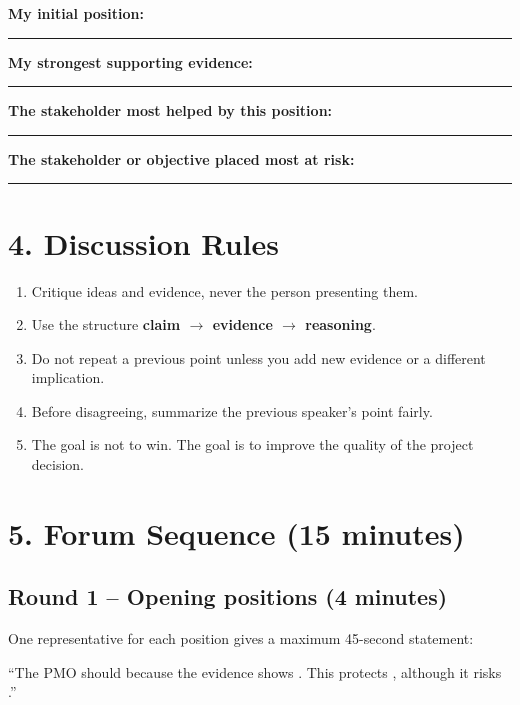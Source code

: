 \documentclass[11pt,a4paper]{article}
\newcommand{\blankline}{\rule{\linewidth}{0.35pt}}
\begin{document}
\textbf{My initial position:} \blankline

\textbf{My strongest supporting evidence:}

\vspace{8mm}\blankline

\textbf{The stakeholder most helped by this position:} \blankline

\textbf{The stakeholder or objective placed most at risk:} \blankline

\section{4. Discussion Rules}

\begin{rulebox}
\begin{enumerate}
  \item Critique ideas and evidence, never the person presenting them.
  \item Use the structure \textbf{claim $\rightarrow$ evidence $\rightarrow$ reasoning}.
  \item Do not repeat a previous point unless you add new evidence or a different implication.
  \item Before disagreeing, summarize the previous speaker's point fairly.
  \item The goal is not to win. The goal is to improve the quality of the project decision.
\end{enumerate}
\end{rulebox}

\section{5. Forum Sequence (15 minutes)}

\subsection*{Round 1 -- Opening positions (4 minutes)}

One representative for each position gives a maximum 45-second statement:

\begin{forumbox}
``The PMO should \underline{\hspace{4cm}} because the evidence shows \underline{\hspace{4cm}}. This protects \underline{\hspace{3cm}}, although it risks \underline{\hspace{3cm}}.''
\end{forumbox}
\end{document}
